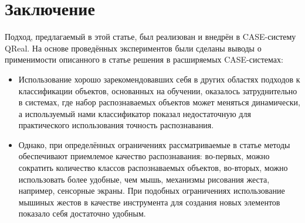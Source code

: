 \documentclass[a5paper]{article}
\begin{document}
\section{Заключение}
Подход, предлагаемый в этой статье, был реализован и внедрён в CASE-систему QReal. На основе проведённых экспериментов были сделаны выводы о применимости описанного в статье решения в расширяемых CASE-системах: 
\begin{itemize}
  \item Использование хорошо зарекомендовавших себя в других областях подходов к классификации объектов, основанных на обучении, оказалось затруднительно в системах, где набор распознаваемых объектов может меняться динамически, а используемый нами классификатор показал недостаточную для практического использования точность распознавания.
  \item Однако, при определённых ограничениях рассматриваемые в статье методы обеспечивают приемлемое качество распознавания: во-первых, можно сократить количество классов  распознаваемых объектов, во-вторых, можно использовать более удобные, чем мышь, механизмы рисования жеста, например, сенсорные экраны. При подобных ограничениях использование мышиных жестов в качестве инструмента для создания новых элементов показало себя достаточно удобным.
\end{itemize}

\pagebreak
\end{document}
